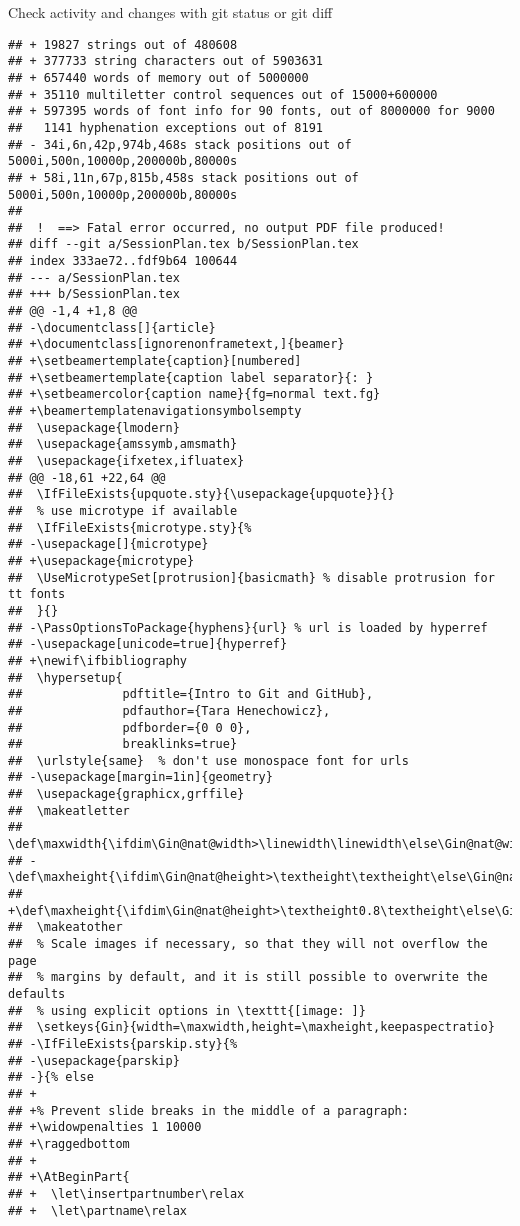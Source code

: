 \documentclass[ignorenonframetext,]{beamer}
\newif\ifbibliography
\let\insertpartnumber\relax
\let\partname\relax
\begin{document}
\begin{frame}[fragile]{Check activity and changes with git status or git
diff}
\begin{verbatim}
## + 19827 strings out of 480608
## + 377733 string characters out of 5903631
## + 657440 words of memory out of 5000000
## + 35110 multiletter control sequences out of 15000+600000
## + 597395 words of font info for 90 fonts, out of 8000000 for 9000
##   1141 hyphenation exceptions out of 8191
## - 34i,6n,42p,974b,468s stack positions out of 5000i,500n,10000p,200000b,80000s
## + 58i,11n,67p,815b,458s stack positions out of 5000i,500n,10000p,200000b,80000s
##  
##  !  ==> Fatal error occurred, no output PDF file produced!
## diff --git a/SessionPlan.tex b/SessionPlan.tex
## index 333ae72..fdf9b64 100644
## --- a/SessionPlan.tex
## +++ b/SessionPlan.tex
## @@ -1,4 +1,8 @@
## -\documentclass[]{article}
## +\documentclass[ignorenonframetext,]{beamer}
## +\setbeamertemplate{caption}[numbered]
## +\setbeamertemplate{caption label separator}{: }
## +\setbeamercolor{caption name}{fg=normal text.fg}
## +\beamertemplatenavigationsymbolsempty
##  \usepackage{lmodern}
##  \usepackage{amssymb,amsmath}
##  \usepackage{ifxetex,ifluatex}
## @@ -18,61 +22,64 @@
##  \IfFileExists{upquote.sty}{\usepackage{upquote}}{}
##  % use microtype if available
##  \IfFileExists{microtype.sty}{%
## -\usepackage[]{microtype}
## +\usepackage{microtype}
##  \UseMicrotypeSet[protrusion]{basicmath} % disable protrusion for tt fonts
##  }{}
## -\PassOptionsToPackage{hyphens}{url} % url is loaded by hyperref
## -\usepackage[unicode=true]{hyperref}
## +\newif\ifbibliography
##  \hypersetup{
##              pdftitle={Intro to Git and GitHub},
##              pdfauthor={Tara Henechowicz},
##              pdfborder={0 0 0},
##              breaklinks=true}
##  \urlstyle{same}  % don't use monospace font for urls
## -\usepackage[margin=1in]{geometry}
##  \usepackage{graphicx,grffile}
##  \makeatletter
##  \def\maxwidth{\ifdim\Gin@nat@width>\linewidth\linewidth\else\Gin@nat@width\fi}
## -\def\maxheight{\ifdim\Gin@nat@height>\textheight\textheight\else\Gin@nat@height\fi}
## +\def\maxheight{\ifdim\Gin@nat@height>\textheight0.8\textheight\else\Gin@nat@height\fi}
##  \makeatother
##  % Scale images if necessary, so that they will not overflow the page
##  % margins by default, and it is still possible to overwrite the defaults
##  % using explicit options in \texttt{[image: ]}
##  \setkeys{Gin}{width=\maxwidth,height=\maxheight,keepaspectratio}
## -\IfFileExists{parskip.sty}{%
## -\usepackage{parskip}
## -}{% else
## +
## +% Prevent slide breaks in the middle of a paragraph:
## +\widowpenalties 1 10000
## +\raggedbottom
## +
## +\AtBeginPart{
## +  \let\insertpartnumber\relax
## +  \let\partname\relax

\end{verbatim}
\end{frame}
\end{document}
